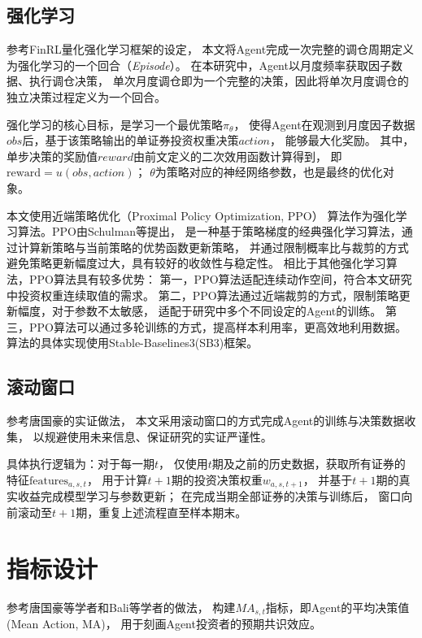 \subsection{强化学习}

参考FinRL量化强化学习框架的设定\cite{liu2021finrl}，
本文将Agent完成一次完整的调仓周期定义为强化学习的一个回合（\textit{Episode}）。
在本研究中，Agent以月度频率获取因子数据、执行调仓决策，
单次月度调仓即为一个完整的决策，因此将单次月度调仓的独立决策过程定义为一个回合。

强化学习的核心目标，是学习一个最优策略$\pi_\theta$，
使得Agent在观测到月度因子数据$obs$后，基于该策略输出的单证券投资权重决策$action$，
能够最大化奖励。
其中，单步决策的奖励值$reward$由前文定义的二次效用函数计算得到，
即$\mathrm{reward} = u(obs,action)$；
$\theta$为策略对应的神经网络参数，也是最终的优化对象。

本文使用近端策略优化（Proximal Policy Optimization, PPO）
算法作为强化学习算法。PPO由Schulman等\cite{schulman2017proximal}提出，
是一种基于策略梯度的经典强化学习算法，通过计算新策略与当前策略的优势函数更新策略，
并通过限制概率比与裁剪的方式避免策略更新幅度过大，具有较好的收敛性与稳定性。
相比于其他强化学习算法，PPO算法具有较多优势：
第一，PPO算法适配连续动作空间，符合本文研究中投资权重连续取值的需求。
第二，PPO算法通过近端裁剪的方式，限制策略更新幅度，对于参数不太敏感，
适配于研究中多个不同设定的Agent的训练。
第三，PPO算法可以通过多轮训练的方式，提高样本利用率，更高效地利用数据。
算法的具体实现使用Stable-Baselines3(SB3)\cite{raffin2021stable}框架。

\subsection{滚动窗口}
参考唐国豪\cite{唐国豪2025投资者预期协同}的实证做法，
本文采用滚动窗口的方式完成Agent的训练与决策数据收集，
以规避使用未来信息、保证研究的实证严谨性。

具体执行逻辑为：对于每一期$t$，
仅使用$t$期及之前的历史数据，获取所有证券的特征$\mathrm{features}_{a,s,t}$，
用于计算$t+1$期的投资决策权重$w_{a,s,t+1}$，
并基于$t+1$期的真实收益完成模型学习与参数更新；
在完成当期全部证券的决策与训练后，
窗口向前滚动至$t+1$期，重复上述流程直至样本期末。

\section{指标设计}

参考唐国豪等学者\cite{唐国豪2025投资者预期协同}和Bali等学者\cite{bali2023machine}的做法，
构建$MA_{s,t}$指标，即Agent的平均决策值(Mean Action, MA)，
用于刻画Agent投资者的预期共识效应。

